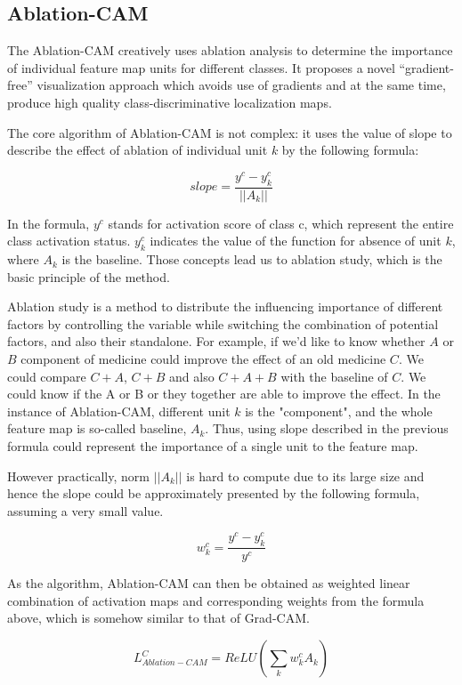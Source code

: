 \documentclass[conference]{IEEEtran}
\begin{document}
\subsection{Ablation-CAM}

The Ablation-CAM creatively uses ablation analysis to determine the importance of individual feature map units for different classes. It proposes a novel “gradient-free” visualization approach which avoids use of gradients and at the same time, produce high quality class-discriminative localization maps.\par

The core algorithm of Ablation-CAM is not complex: it uses the value of slope to describe the effect of ablation of individual unit $k$ by the following formula:

$$slope = \frac{y^c-y^c_k}{||A_k||}$$

In the formula, $y^c$ stands for activation score of class c, which represent the entire class activation status. $y^c_k$ indicates the value of the function for absence of unit $k$, where $A_k$ is the baseline. Those concepts lead us to ablation study, which is the basic principle of the method.\par
Ablation study is a method to distribute the influencing importance of different factors by controlling the variable while switching the combination of potential factors, and also their standalone. For example, if we'd like to know whether $A$ or $B$ component of medicine could improve the effect of an old medicine $C$. We could compare $C+A$, $C+B$ and also $C+A+B$ with the baseline of $C$. We could know if the A or B or they together are able to improve the effect. In the instance of Ablation-CAM, different unit $k$ is the "component", and the whole feature map is so-called baseline, $A_k$. Thus, using slope described in the previous formula could represent the importance of a single unit to the feature map.\par
However practically, norm $||A_k||$ is hard to compute due to its large size and hence the slope could be approximately presented by the following formula, assuming a very small value.

$$w^c_k = \frac{y^c-y^c_k}{y^c}$$

As the algorithm, Ablation-CAM can then be obtained as weighted linear combination of activation maps and corresponding weights from the formula above, which is somehow similar to that of Grad-CAM.

$$L^C_{Ablation-CAM}=ReLU(\sum_k {w^c_k}{A_k})$$
\end{document}
